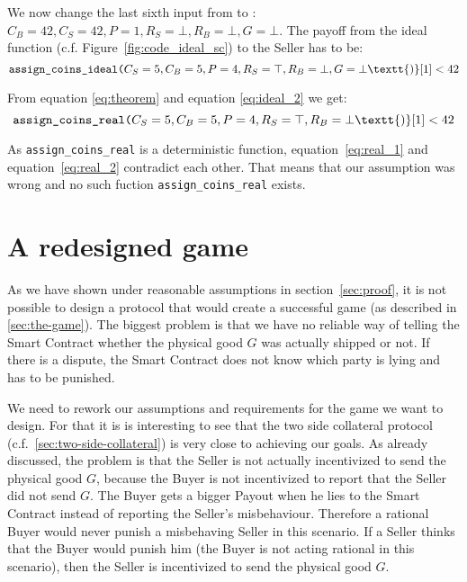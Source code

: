 \documentclass{cacthesis}
\begin{document}
We now change the last sixth input from \top to \bot: $C_B=42,C_S=42,P=1,R_S=\bot,R_B=\bot,G=\bot$. The payoff from the ideal function (c.f. Figure~\ref{fig:code_ideal_sc}) to the Seller has to be:
\begin{equation}
\label{eq:ideal_2}
    \texttt{assign\_coins\_ideal(}C_S=5,C_B=5,P=4, R_S=\top,R_B=\bot,G=\bot\textt{)}[1] <  42
\end{equation}

From equation \ref{eq:theorem} and equation \ref{eq:ideal_2} we get:
\begin{equation}
\label{eq:real_2}
    \texttt{assign\_coins\_real(}C_S=5,C_B=5,P=4,R_S=\top,R_B=\bot\textt{)}[1] <  42
\end{equation}

As \texttt{assign\_coins\_real} is a deterministic function, equation~\ref{eq:real_1} and equation~\ref{eq:real_2} contradict each other. That means that our assumption was wrong and no such fuction  \texttt{assign\_coins\_real} exists.



\chapter{A redesigned game}
\label{cha:redisigned-game}

As we have shown under reasonable assumptions in section~\ref{sec:proof}, it is not possible to design a protocol that would create a successful game (as described in \ref{sec:the-game}). The biggest problem is that we have no reliable way of telling the Smart Contract whether the physical good $G$ was actually shipped or not. If there is a dispute, the Smart Contract does not know which party is lying and has to be punished.\newline

We need to rework our assumptions and requirements for the game we want to design. For that it is is interesting to see that the two side collateral protocol (c.f.~\ref{sec:two-side-collateral}) is very close to achieving our goals. As already discussed, the problem is that the Seller is not actually incentivized to send the physical good $G$, because the Buyer is not incentivized to report that the Seller did not send $G$. The Buyer gets a bigger Payout when he lies to the Smart Contract instead of reporting the Seller's misbehaviour. Therefore a rational Buyer would never punish a misbehaving Seller in this scenario. If a Seller thinks that the Buyer would punish him (the Buyer is not acting rational in this scenario), then the Seller is incentivized to send the physical good $G$.\newline
\end{document}
